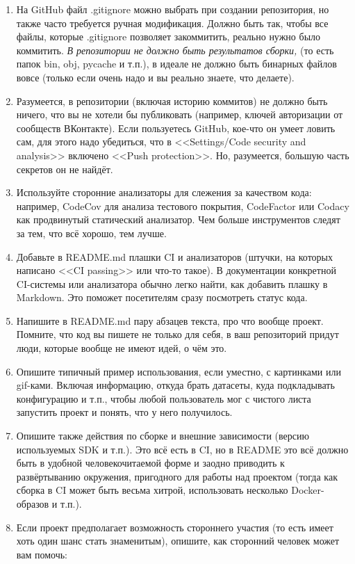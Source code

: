 \documentclass[a5paper]{article}
\begin{document}
\begin{enumerate}
\begin{itemize}
    \end{itemize}
    \item На GitHub файл .gitignore можно выбрать при создании репозитория, но также часто требуется ручная модификация. Должно быть так, чтобы все файлы, которые .gitignore позволяет закоммитить, реально нужно было коммитить. \emph{В репозитории не должно быть результатов сборки,} (то есть папок bin, obj, pycache и т.п.), в идеале не должно быть бинарных файлов вовсе (только если очень надо и вы реально знаете, что делаете).
    \item Разумеется, в репозитории (включая историю коммитов) не должно быть ничего, что вы не хотели бы публиковать (например, ключей авторизации от сообществ ВКонтакте). Если пользуетесь GitHub, кое-что он умеет ловить сам, для этого надо убедиться, что в <<Settings/Code security and analysis>> включено <<Push protection>>. Но, разумеется, большую часть секретов он не найдёт.
    \item Используйте сторонние анализаторы для слежения за качеством кода: например, CodeCov для анализа тестового покрытия, CodeFactor или Codacy как продвинутый статический анализатор. Чем больше инструментов следят за тем, что всё хорошо, тем лучше.
    \item Добавьте в README.md плашки CI и анализаторов (штучки, на которых написано <<CI passing>> или что-то такое). В документации конкретной CI-системы или анализатора обычно легко найти, как добавить плашку в Markdown. Это поможет посетителям сразу посмотреть статус кода.
    \item Напишите в README.md пару абзацев текста, про что вообще проект. Помните, что код вы пишете не только для себя, в ваш репозиторий придут люди, которые вообще не имеют идей, о чём это.
    \item Опишите типичный пример использования, если уместно, с картинками или gif-ками. Включая информацию, откуда брать датасеты, куда подкладывать конфигурацию и т.п., чтобы любой пользователь мог с чистого листа запустить проект и понять, что у него получилось.
    \item Опишите также действия по сборке и внешние зависимости (версию используемых SDK и т.п.). Это всё есть в CI, но в README это всё должно быть в удобной человекочитаемой форме и заодно приводить к развёртыванию окружения, пригодного для работы над проектом (тогда как сборка в CI может быть весьма хитрой, использовать несколько Docker-образов и т.п.).
    \item Если проект предполагает возможность стороннего участия (то есть имеет хоть один шанс стать знаменитым), опишите, как сторонний человек может вам помочь:

\end{enumerate}
\end{document}
